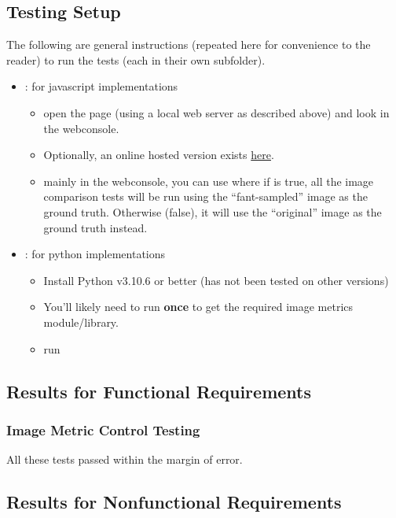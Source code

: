 \documentclass[12pt, titlepage]{article}
\begin{document}
\subsection{Testing Setup}
The following are general instructions (repeated here for convenience to the reader)
to run the tests (each in their own subfolder).
\begin{itemize}
  \item {}: for javascript implementations
  \begin{itemize}
    \item open the  page (using a local web server as described above)
      and look in the webconsole.
    \item Optionally, an online hosted version exists
    \href{https://joedf.github.io/ImgBeamer/tests/image_metrics/js-tests/}{here}.
    \item mainly in the webconsole, you can use  where if 
      is true, all the image comparison tests will be run using the ``fant-sampled'' image \cite{fant_1986} as
      the ground truth. Otherwise (false), it will use the ``original'' image as the ground truth instead.
  \end{itemize}
  \item {}: for python implementations
  \begin{itemize}
    \item Install Python v3.10.6 or better (has not been tested on other versions)
    \item You'll likely need to run  \textbf{once} to get the required
      image metrics module/library.
    \item run 
  \end{itemize}
\end{itemize}

\subsection{Results for Functional Requirements}
\subsubsection{Image Metric Control Testing}
All these tests passed within the margin of error.

\subsection{Results for Nonfunctional Requirements}
\end{document}
